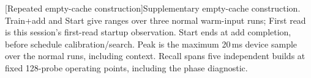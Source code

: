 \par\medskip\noindent\begin{minipage}{\linewidth}
\centering\captionsetup{hypcap=false}
[Repeated empty-cache construction]{Supplementary empty-cache construction. Train+add and Start
give ranges over three normal warm-input runs; First read is this session's
first-read startup observation. Start ends at add completion, before
schedule calibration/search. Peak is the maximum 20\,ms device sample
over the normal runs, including context. Recall spans five independent
builds at fixed 128-probe operating points, including the phase diagnostic.}
\label{tab:7-build-repeat}
\scriptsize\setlength{\tabcolsep}{3pt}

\end{minipage}\par\medskip
